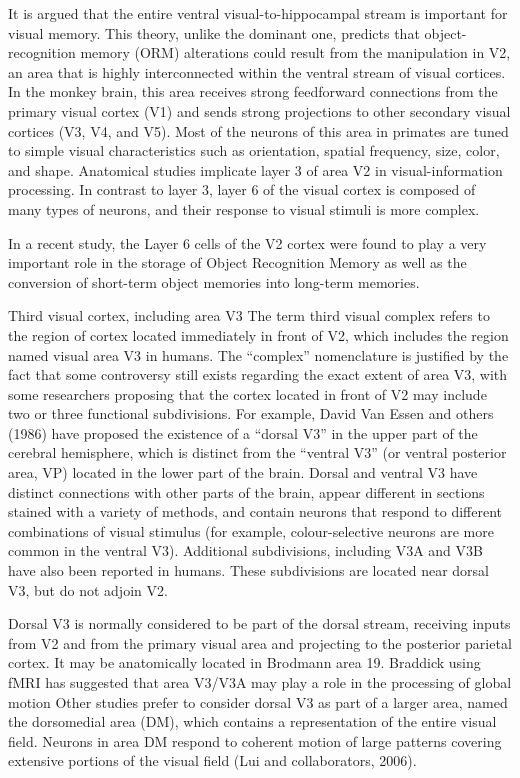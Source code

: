 \documentclass[]{book}
\begin{document}
It is argued that the entire ventral visual-to-hippocampal stream is important for visual memory. This theory, unlike the dominant one, predicts that object-recognition memory (ORM) alterations could result from the manipulation in V2, an area that is highly interconnected within the ventral stream of visual cortices. In the monkey brain, this area receives strong feedforward connections from the primary visual cortex (V1) and sends strong projections to other secondary visual cortices (V3, V4, and V5). Most of the neurons of this area in primates are tuned to simple visual characteristics such as orientation, spatial frequency, size, color, and shape. Anatomical studies implicate layer 3 of area V2 in visual-information processing. In contrast to layer 3, layer 6 of the visual cortex is composed of many types of neurons, and their response to visual stimuli is more complex.

In a recent study, the Layer 6 cells of the V2 cortex were found to play a very important role in the storage of Object Recognition Memory as well as the conversion of short-term object memories into long-term memories.

Third visual cortex, including area V3
The term third visual complex refers to the region of cortex located immediately in front of V2, which includes the region named visual area V3 in humans. The ``complex'' nomenclature is justified by the fact that some controversy still exists regarding the exact extent of area V3, with some researchers proposing that the cortex located in front of V2 may include two or three functional subdivisions. For example, David Van Essen and others (1986) have proposed the existence of a ``dorsal V3'' in the upper part of the cerebral hemisphere, which is distinct from the ``ventral V3'' (or ventral posterior area, VP) located in the lower part of the brain. Dorsal and ventral V3 have distinct connections with other parts of the brain, appear different in sections stained with a variety of methods, and contain neurons that respond to different combinations of visual stimulus (for example, colour-selective neurons are more common in the ventral V3). Additional subdivisions, including V3A and V3B have also been reported in humans. These subdivisions are located near dorsal V3, but do not adjoin V2.

Dorsal V3 is normally considered to be part of the dorsal stream, receiving inputs from V2 and from the primary visual area and projecting to the posterior parietal cortex. It may be anatomically located in Brodmann area 19. Braddick using fMRI has suggested that area V3/V3A may play a role in the processing of global motion Other studies prefer to consider dorsal V3 as part of a larger area, named the dorsomedial area (DM), which contains a representation of the entire visual field. Neurons in area DM respond to coherent motion of large patterns covering extensive portions of the visual field (Lui and collaborators, 2006).
\end{document}
